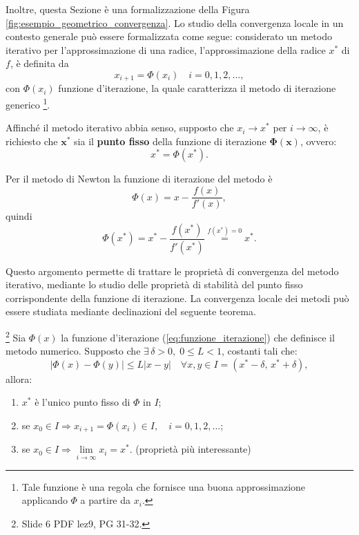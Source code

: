 Inoltre, questa Sezione è una formalizzazione della Figura \ref{fig:esempio_geometrico_convergenza}.
Lo studio della convergenza locale in un contesto generale può essere formalizzata come segue: considerato un metodo iterativo per l'approssimazione di una radice, l'approssimazione della radice $x^*$ di $f$, è definita da
\begin{equation}\label{eq:funzione_iterazione}
	x_{i+1}=\Phi (x_i)\quad i=0,1,2,\hdots,
\end{equation}
con $\Phi (x_i)$ funzione d'iterazione, la quale caratterizza il metodo di iterazione generico \footnote{Tale funzione è una regola che fornisce una buona approssimazione applicando $\Phi$ a partire da $x_i$.}.

Affinché il metodo iterativo abbia senso, supposto che $x_i\rightarrow x^*$ per $i\rightarrow\infty$, è richiesto che $\boldsymbol{x^*}$ sia il \textbf{punto fisso} della funzione di iterazione $\boldsymbol{\Phi(x)}$, ovvero:
\begin{equation*}
	x^*=\Phi (x^*).
\end{equation*}

\begin{definition}
	Per il metodo di Newton la funzione di iterazione del metodo è
	\begin{equation}\label{eq:funzione_iterazione_newton}
		\Phi (x)=x-\frac{f(x)}{f'(x)},
	\end{equation}
	quindi
	\begin{equation*}
		\Phi (x^*)=x^*-\frac{f(x^*)}{f'(x^*)}\overset{f(x^*)=0}{=}x^*.
	\end{equation*}
\end{definition}

Questo argomento permette di trattare le proprietà di convergenza del metodo iterativo, mediante lo studio delle proprietà di stabilità del punto fisso corrispondente della funzione di iterazione. La convergenza locale dei metodi può essere studiata mediante declinazioni del seguente teorema.

\begin{theorem}\label{th:punto_fisso}
	\footnote{Slide 6 PDF lez9, PG 31-32.}
	Sia $\Phi(x)$ la funzione d'iterazione (\ref{eq:funzione_iterazione}) che definisce il \gls{metodo numerico}. Supposto che $\exists\,\delta >0,\; 0\leq L<1$, costanti tali che:
	\begin{equation*}
		|\Phi (x)-\Phi (y)|\leq L|x-y| \quad\forall x,y \in I=(x^*-\delta,\, x^*+\delta),
	\end{equation*}
	allora:
	\begin{enumerate}
		\item $x^*$ è l'unico punto fisso di $\Phi$ in $I$;
		\item se $x_0 \in I\Rightarrow x_{i+1} = \Phi(x_i)\in I,\quad i=0,1,2,\hdots$;
		\item se $x_0\in I \Rightarrow \underset{{i\to\infty}}{\lim}{x_i}=x^*$. (proprietà più interessante)
	\end{enumerate}
\end{theorem}

